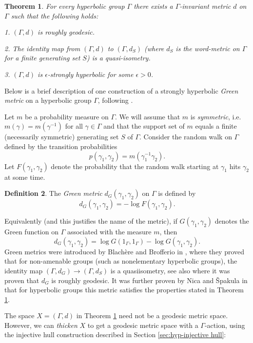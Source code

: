 \documentclass[12pt]{amsbook}%
\newtheorem{thm}{Theorem}[chapter]
\theoremstyle{definition}
\newtheorem{defi}[thm]{Definition}
\theoremstyle{remark}
\numberwithin{section}{chapter}
\numberwithin{subsection}{section}
\numberwithin{figure}{chapter}
\def\eps{\epsilon}
\def\Ga{\Gamma}
\def\ga{\gamma}
\begin{document}
\begin{thm}\label{thm:strongly hyperbolic} 
For every hyperbolic group $\Ga$ there exists a $\Ga$-invariant metric $d$ on $\Ga$ such that the following holds:

1. $(\Ga, d)$ is roughly geodesic.

2. The identity map from $(\Ga, d)$ to $(\Ga, d_S)$ (where $d_S$ is the word-metric on $\Ga$ for a finite generating set $S$) is a quasi-isometry. 

3. $(\Ga, d)$ is $\epsilon$-strongly hyperbolic for some $\eps>0$. 
\end{thm}



\medskip
Below is a brief description of one construction of a strongly hyperbolic {\em Green metric} on a hyperbolic group $\Ga$, following 
\cite{Nica-Spakula}. 

Let $m$ be a  probability measure on $\Ga$. We will assume that $m$ is {\em symmetric}, i.e. 
$m(\ga)=m(\ga^{-1})$ for all $\ga\in \Ga$ and that the support set of $m$ equals a finite (necessarily symmetric) generating set $S$ of $\Ga$. 
Consider the random walk on $\Ga$ defined by the transition probabilities 
$$
p(\ga_1,\ga_2)= m(\ga_1^{-1}\ga_2). 
$$
Let $F(\ga_1,\ga_2)$ denote the probability that the random walk starting at $\ga_1$ hits $\ga_2$ at some time. 

\begin{defi}\label{def:G-metric}
The 
{\em Green metric} $d_G(\ga_1, \ga_2)$ on $\Ga$ is defined by
$$
d_G(\ga_1, \ga_2)= -\log F(\ga_1, \ga_2). 
$$
\end{defi}

Equivalently (and this justifies the name of the metric), if $G(\ga_1, \ga_2)$ denotes the Green function on $\Ga$ associated with the measure $m$, then  
$$
d_G(\ga_1, \ga_2)= \log G(1_\Ga, 1_\Ga) - \log G(\ga_1, \ga_2). 
$$
Green metrics were introduced by Blach\`ere  and Brofferio in \cite{MR2278460}, where they proved that for non-amenable groups 
(such as nonelementary hyperbolic groups), the identity map $(\Ga, d_G)\to (\Ga, d_S)$ is a quasiisometry, see also \cite[Corollary 1.2]{BHM} where it was proven that $d_G$ is roughly geodesic. It was further proven by Nica and \v{S}pakula in \cite{Nica-Spakula} that for hyperbolic groups this metric satisfies the properties stated in Theorem \ref{thm:strongly hyperbolic}. 

\medskip
The space $X=(\Ga, d)$ in Theorem \ref{thm:strongly hyperbolic} need not be a geodesic metric space. However, we can {\em thicken} $X$ to get a 
geodesic metric space with a $\Ga$-action, using the injective hull construction described in Section \ref{sec:hyp-injective hull}: 
\end{document}
